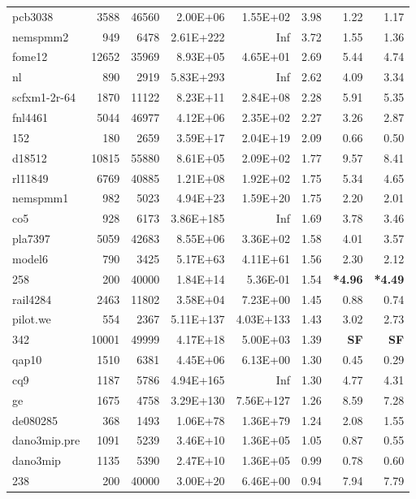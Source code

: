 \documentclass[10pt]{article}
\newcommand{\red}{
	\color{red}	
	}
\begin{document}
\begin{longtable}{|l|r|r|r|r|r|r|r|}
pcb3038	&	3588	&	46560	&	2.00E+06	&	1.55E+02	&	3.98	&	1.22	&	1.17	\\
nemspmm2	&	949	&	6478	&	2.61E+222	&	Inf	&	3.72	&	1.55	&	1.36	\\
fome12	&	12652	&	35969	&	8.93E+05	&	4.65E+01	&	2.69	&	5.44	&	4.74	\\
nl	&	890	&	2919	&	5.83E+293	&	Inf	&	2.62	&	4.09	&	3.34	\\
scfxm1-2r-64	&	1870	&	11122	&	8.23E+11	&	2.84E+08	&	2.28	&	5.91	&	5.35	\\
fnl4461	&	5044	&	46977	&	4.12E+06	&	2.35E+02	&	2.27	&	3.26	&	2.87	\\
152	&	180	&	2659	&	3.59E+17	&	2.04E+19	&	2.09	&	0.66	&	0.50	\\
d18512	&	10815	&	55880	&	8.61E+05	&	2.09E+02	&	1.77	&	9.57	&	8.41	\\
rl11849	&	6769	&	40885	&	1.21E+08	&	1.92E+02	&	1.75	&	5.34	&	4.65	\\
nemspmm1	&	982	&	5023	&	4.94E+23	&	1.59E+20	&	1.75	&	2.20	&	2.01	\\
co5	&	928	&	6173	&	3.86E+185	&	Inf	&	1.69	&	3.78	&	3.46	\\
pla7397	&	5059	&	42683	&	8.55E+06	&	3.36E+02	&	1.58	&	4.01	&	3.57	\\
model6	&	790	&	3425	&	5.17E+63	&	4.11E+61	&	1.56	&	2.30	&	2.12	\\
258	&	200	&	40000	&	1.84E+14	&	5.36E-01	&	1.54	&	{\bf \red *4.96}	&	{\bf \red *4.49} 	\\
rail4284	&	2463	&	11802	&	3.58E+04	&	7.23E+00	&	1.45	&	0.88	&	0.74	\\
pilot.we	&	554	&	2367	&	5.11E+137	&	4.03E+133	&	1.43	&	3.02	&	2.73	\\
342	&	10001	&	49999	&	4.17E+18	&	5.00E+03	&	1.39	&	{\bf \red SF}	&	{\bf \red SF}	\\
qap10	&	1510	&	6381	&	4.45E+06	&	6.13E+00	&	1.30	&	0.45	&	0.29	\\
cq9	&	1187	&	5786	&	4.94E+165	&	Inf	&	1.30	&	4.77	&	4.31	\\
ge	&	1675	&	4758	&	3.29E+130	&	7.56E+127	&	1.26	&	8.59	&	7.28	\\
de080285	&	368	&	1493	&	1.06E+78	&	1.36E+79	&	1.24	&	2.08	&	1.55	\\
dano3mip.pre	&	1091	&	5239	&	3.46E+10	&	1.36E+05	&	1.05	&	0.87	&	0.55	\\
dano3mip	&	1135	&	5390	&	2.47E+10	&	1.36E+05	&	0.99	&	0.78	&	0.60	\\
238	&	200	&	40000	&	3.00E+20	&	6.46E+00	&	0.94	&	7.94	&	7.79	\\

\end{longtable}
\end{document}
